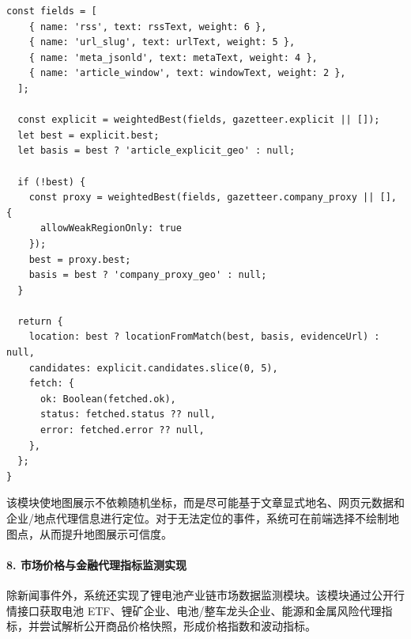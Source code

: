 \documentclass[12pt,a4paper]{article}
\begin{document}
\begin{lstlisting}[style=projectcode,caption={新闻地理位置抽取与地图定位增强}]
  const fields = [
    { name: 'rss', text: rssText, weight: 6 },
    { name: 'url_slug', text: urlText, weight: 5 },
    { name: 'meta_jsonld', text: metaText, weight: 4 },
    { name: 'article_window', text: windowText, weight: 2 },
  ];

  const explicit = weightedBest(fields, gazetteer.explicit || []);
  let best = explicit.best;
  let basis = best ? 'article_explicit_geo' : null;

  if (!best) {
    const proxy = weightedBest(fields, gazetteer.company_proxy || [], {
      allowWeakRegionOnly: true
    });
    best = proxy.best;
    basis = best ? 'company_proxy_geo' : null;
  }

  return {
    location: best ? locationFromMatch(best, basis, evidenceUrl) : null,
    candidates: explicit.candidates.slice(0, 5),
    fetch: {
      ok: Boolean(fetched.ok),
      status: fetched.status ?? null,
      error: fetched.error ?? null,
    },
  };
}
\end{lstlisting}

该模块使地图展示不依赖随机坐标，而是尽可能基于文章显式地名、网页元数据和企业/地点代理信息进行定位。对于无法定位的事件，系统可在前端选择不绘制地图点，从而提升地图展示可信度。

\paragraph{8. 市场价格与金融代理指标监测实现}

除新闻事件外，系统还实现了锂电池产业链市场数据监测模块。该模块通过公开行情接口获取电池 ETF、锂矿企业、电池/整车龙头企业、能源和金属风险代理指标，并尝试解析公开商品价格快照，形成价格指数和波动指标。
\end{document}
